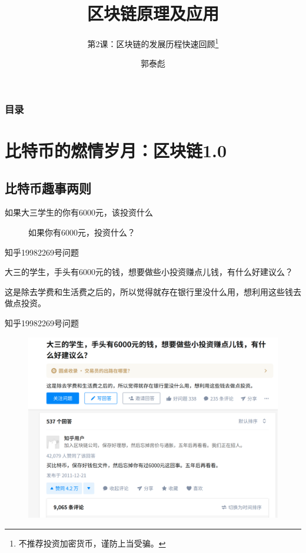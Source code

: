 \documentclass[11pt]{beamer}
\begin{document}
\author{郭泰彪}
\title{区块链原理及应用}
\subtitle{第2课：区块链的发展历程快速回顾\footnote{不推荐投资加密货币，谨防上当受骗。}}

\begin{frame}[plain]
	\maketitle
\end{frame}

\begin{frame}[shrink]
	\frametitle{目录}
	\tableofcontents[sectionstyle=show,subsectionstyle=show/shaded,subsubsectionstyle=show/shaded]
\end{frame}

\section{比特币的燃情岁月：区块链1.0}

\subsection{比特币趣事两则}
\begin{frame}{如果大三学生的你有6000元，该投资什么}
	\begin{figure}
		\centering
		{\Huge 如果你有6000元，投资什么？}
	\end{figure}
\end{frame}

\begin{frame}{知乎19982269号问题}

	大三的学生，手头有6000元的钱，想要做些小投资赚点儿钱，有什么好建议么？

	\footnotesize{这是除去学费和生活费之后的，所以觉得就存在银行里没什么用，想利用这些钱去做点投资。}
\end{frame}

\begin{frame}{知乎19982269号问题}
	\begin{figure}
		\centering
		\includegraphics[width=0.8\linewidth]{figures/zhihu19982269}
		\label{fig:zhihu19982269}
	\end{figure}
\end{frame}
\end{document}
